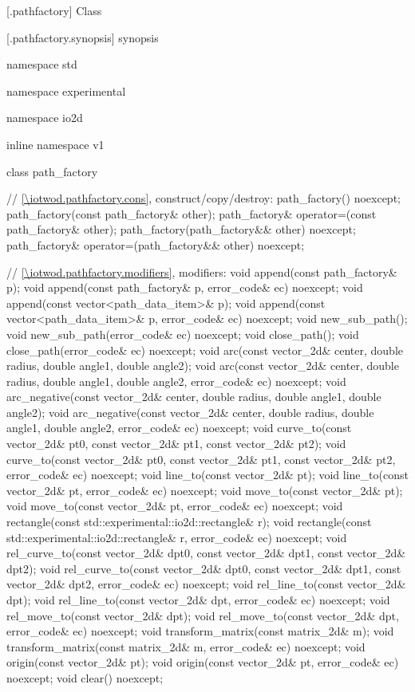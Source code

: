  [\iotwod.pathfactory] {Class }

 [\iotwod.pathfactory.synopsis] { synopsis}

\begin{codeblock}
namespace std { namespace experimental { namespace io2d { inline namespace v1 {
  class path_factory {
    // \ref{\iotwod.pathfactory.cons}, construct/copy/destroy:
    path_factory() noexcept;
    path_factory(const path_factory& other);
    path_factory& operator=(const path_factory& other);
    path_factory(path_factory&& other) noexcept;
    path_factory& operator=(path_factory&& other) noexcept;
    
    // \ref{\iotwod.pathfactory.modifiers}, modifiers:
    void append(const path_factory& p);
    void append(const path_factory& p, error_code& ec) noexcept;
    void append(const vector<path_data_item>& p);
    void append(const vector<path_data_item>& p, error_code& ec) noexcept;
    void new_sub_path();
    void new_sub_path(error_code& ec) noexcept;
    void close_path();
    void close_path(error_code& ec) noexcept;
    void arc(const vector_2d& center, double radius, double angle1,
      double angle2);
    void arc(const vector_2d& center, double radius, double angle1,
      double angle2, error_code& ec) noexcept;
    void arc_negative(const vector_2d& center, double radius, double angle1,
      double angle2);
    void arc_negative(const vector_2d& center, double radius, double angle1,
      double angle2, error_code& ec) noexcept;
    void curve_to(const vector_2d& pt0, const vector_2d& pt1,
      const vector_2d& pt2);
    void curve_to(const vector_2d& pt0, const vector_2d& pt1,
      const vector_2d& pt2, error_code& ec) noexcept;
    void line_to(const vector_2d& pt);
    void line_to(const vector_2d& pt, error_code& ec) noexcept;
    void move_to(const vector_2d& pt);
    void move_to(const vector_2d& pt, error_code& ec) noexcept;
    void rectangle(const std::experimental::io2d::rectangle& r);
    void rectangle(const std::experimental::io2d::rectangle& r,
      error_code& ec) noexcept;
    void rel_curve_to(const vector_2d& dpt0, const vector_2d& dpt1,
      const vector_2d& dpt2);
    void rel_curve_to(const vector_2d& dpt0, const vector_2d& dpt1,
      const vector_2d& dpt2, error_code& ec) noexcept;
    void rel_line_to(const vector_2d& dpt);
    void rel_line_to(const vector_2d& dpt, error_code& ec) noexcept;
    void rel_move_to(const vector_2d& dpt);
    void rel_move_to(const vector_2d& dpt, error_code& ec) noexcept;
    void transform_matrix(const matrix_2d& m);
    void transform_matrix(const matrix_2d& m, error_code& ec) noexcept;
    void origin(const vector_2d& pt);
    void origin(const vector_2d& pt, error_code& ec) noexcept;
    void clear() noexcept;
    
}}}}}
\end{codeblock}
